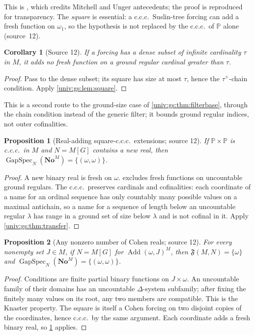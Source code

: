 \documentclass[11pt,letterpaper]{article}
\numberwithin{equation}{section}
\newtheorem{proposition}[proposition]{Proposition}
\newtheorem{corollary}[corollary]{Corollary}
\theoremstyle{definition}
\theoremstyle{remark}
\newcommand{\No}{\mathbf{No}}
\newcommand{\NoM}{\No^{M}}
\newcommand{\GapSpec}{\operatorname{GapSpec}}
\newcommand{\Add}{\operatorname{Add}}
\newcommand{\FF}{\mathfrak F}
\begin{document}
This is \cite[Proposition~2.2]{FKW}, which credits Mitchell and Unger antecedents;
the proof is reproduced for transparency. The \emph{square} is essential: a c.c.c.\
Suslin-tree forcing can add a fresh function on $\omega_1$, so the hypothesis is not
replaced by the c.c.c.\ of $\mathbb P$ alone (source~12).

\begin{corollary}[Source 12]\label{univ:gs:cor:size}
If a forcing has a dense subset of infinite cardinality $\tau$ in $M$, it adds no
fresh function on a ground regular cardinal greater than $\tau$.
\end{corollary}
\begin{proof}
Pass to the dense subset; its square has size at most $\tau$, hence the
$\tau^+$-chain condition. Apply \cref{univ:gs:lem:square}.
\end{proof}

This is a second route to the ground-size case of \cref{univ:gs:thm:filterbase},
through the chain condition instead of the generic filter; it bounds ground regular
indices, not outer cofinalities.

\begin{proposition}[Real-adding square-c.c.c.\ extensions; source 12]\label{univ:gs:prop:squareccc}
If $\mathbb P\times\mathbb P$ is c.c.c.\ in $M$ and $N=M[G]$ contains a new real, then
$\GapSpec_N(\NoM)=\{(\omega,\omega)\}$.
\end{proposition}
\begin{proof}
A new binary real is fresh on $\omega$.  excludes fresh
functions on uncountable ground regulars. The c.c.c.\ preserves cardinals and
cofinalities: each coordinate of a name for an ordinal sequence has only countably
many possible values on a maximal antichain, so a name for a sequence of length
below an uncountable regular $\lambda$ has range in a ground set of size below
$\lambda$ and is not cofinal in it. Apply \cref{univ:gs:thm:transfer}.
\end{proof}

\begin{proposition}[Any nonzero number of Cohen reals; source 12]\label{univ:gs:prop:cohenreals}
For every nonempty set $J\in M$, if $N=M[G]$ for $\Add(\omega,J)^M$, then
$\FF(M,N)=\{\omega\}$ and $\GapSpec_N(\NoM)=\{(\omega,\omega)\}$.
\end{proposition}
\begin{proof}
Conditions are finite partial binary functions on $J\times\omega$. An uncountable
family of their domains has an uncountable $\Delta$-system subfamily; after fixing
the finitely many values on its root, any two members are compatible. This is the
Knaster property. The square is itself a Cohen forcing on two disjoint copies of the
coordinates, hence c.c.c.\ by the same argument. Each coordinate adds a fresh binary
real, so \cref{univ:gs:prop:squareccc} applies.
\end{proof}
\end{document}
